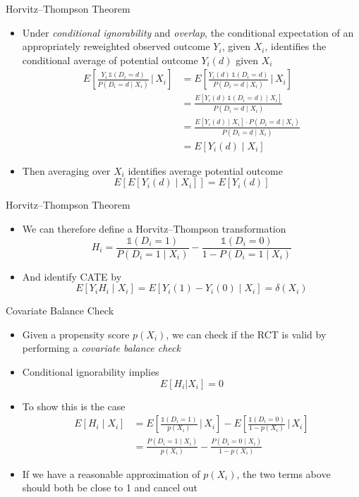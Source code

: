 \documentclass[aspectratio=1610,12pt,xcolor=dvipsnames]{beamer}
\begin{document}
\begin{frame}{Horvitz–Thompson Theorem}

\begin{itemize}
    \item Under \textit{conditional ignorability} and \textit{overlap}, the conditional expectation of an appropriately reweighted observed outcome $Y_i$, given $X_i$, identifies the conditional average of potential outcome $Y_i(d)$ given $X_i$
    \begin{align*}
        E\!\left[\frac{Y_i \,\mathds{1}(D_i=d)}{P(D_i = d \mid X_i)} \,\Big|\, X_i\right] 
&= E\!\left[\frac{Y_i(d)\,\mathds{1}(D_i=d)}{P(D_i = d \mid X_i)} \,\Big|\, X_i\right] \\
&= \frac{E\!\left[Y_i(d)\,\mathds{1}(D_i=d) \mid X_i\right]}{P(D_i = d \mid X_i)} \\
&= \frac{E[Y_i(d) \mid X_i] \cdot P(D_i=d \mid X_i)}{P(D_i = d \mid X_i)} \\
&= E[Y_i(d) \mid X_i]
    \end{align*}
    \item Then averaging over $X_i$ identifies average potential outcome
    \[E[E[Y_i(d) \mid X_i]] = E[Y_i(d)]\]
\end{itemize}
\end{frame}

\begin{frame}{Horvitz–Thompson Theorem}
\begin{itemize}
\item We can therefore define a Horvitz–Thompson transformation
\[
H_i = \frac{\mathds{1}(D_i=1)}{P(D_i=1\mid X_i)} - \frac{\mathds{1}(D_i=0)}{1-P(D_i=1\mid X_i)}
\]
\item And identify CATE by 
\[
E[Y_i H_i \mid X_i] = E[Y_i(1) - Y_i(0) \mid X_i ] = \delta(X_i)
\] 
\end{itemize}
\end{frame}

\begin{frame}{Covariate Balance Check}

\begin{itemize}
    \item Given a propensity score $p(X_i)$, we can check if the RCT is valid by performing a \textit{covariate balance check}
    \item Conditional ignorability implies
    \[E[H_i | X_i] = 0\]
    \item To show this is the case
    \begin{align*}
E[H_i \mid X_i] 
&= E\!\left[\frac{\mathds{1}(D_i=1)}{p(X_i)} \,\Big|\, X_i\right] 
   - E\!\left[\frac{\mathds{1}(D_i=0)}{1-p(X_i)} \,\Big|\, X_i\right] \\
   &= \frac{P(D_i=1 \mid X_i)}{p(X_i)} 
   - \frac{P(D_i=0 \mid X_i)}{1-p(X_i)}
\end{align*}
    \item If we have a reasonable approximation of $p(X_i)$, the two terms above should both be close to 1 and cancel out
\end{itemize}
    
\end{frame}
\end{document}
